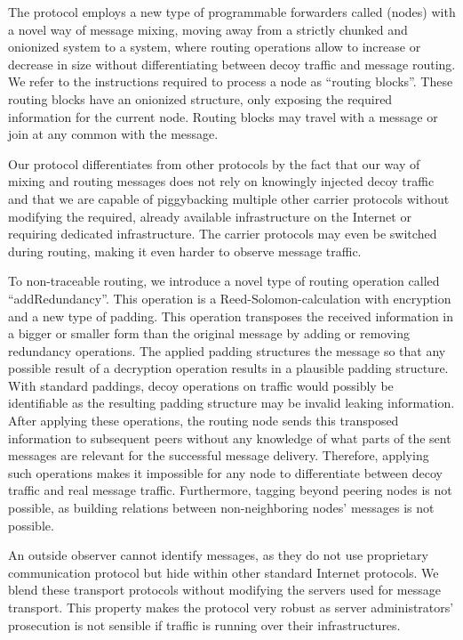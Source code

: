 The protocol employs a new type of programmable forwarders called \VortexNodes (nodes) with a novel way of message mixing, moving away from a strictly chunked and onionized system to a system, where routing operations allow to increase or decrease in size without differentiating between decoy traffic and message routing. We refer to the instructions required to process a node as ``routing blocks''. These routing blocks have an onionized structure, only exposing the required information for the current node. Routing blocks may travel with a message or join at any common \VortexNode with the message.

Our protocol differentiates from other protocols by the fact that our way of mixing and routing messages does not rely on knowingly injected decoy traffic and that we are capable of piggybacking multiple other carrier protocols without modifying the required, already available infrastructure on the Internet or requiring dedicated infrastructure. The carrier protocols may even be switched during routing, making it even harder to observe message traffic. 

To non-traceable routing, we introduce a novel type of routing operation called ``addRedundancy''. This operation is a Reed-Solomon-calculation with encryption and a new type of padding. This operation transposes the received information in a bigger or smaller form than the original message by adding or removing redundancy operations. The applied padding structures the message so that any possible result of a decryption operation results in a plausible padding structure. With standard paddings, decoy operations on traffic would possibly be identifiable as the resulting padding structure may be invalid leaking information. After applying these operations, the routing node sends this transposed information to subsequent peers without any knowledge of what parts of the sent messages are relevant for the successful message delivery. Therefore, applying such operations makes it impossible for any node to differentiate between decoy traffic and real message traffic. Furthermore, tagging beyond peering nodes is not possible, as building relations between non-neighboring nodes' messages is not possible.

An outside observer cannot identify messages, as they do not use proprietary communication protocol but hide within other standard Internet protocols. We blend these transport protocols without modifying the servers used for message transport. This property makes the protocol very robust as server administrators' prosecution is not sensible if traffic is running over their infrastructures. 

